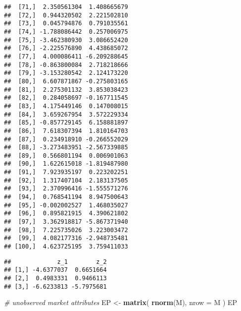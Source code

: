 \documentclass[
]{book}
\newenvironment{Shaded}{\begin{snugshade}}{\end{snugshade}}
\newcommand{\CommentTok}[1]{\textcolor[rgb]{0.56,0.35,0.01}{\textit{#1}}}
\newcommand{\DataTypeTok}[1]{\textcolor[rgb]{0.13,0.29,0.53}{#1}}
\newcommand{\DecValTok}[1]{\textcolor[rgb]{0.00,0.00,0.81}{#1}}
\newcommand{\KeywordTok}[1]{\textcolor[rgb]{0.13,0.29,0.53}{\textbf{#1}}}
\newcommand{\NormalTok}[1]{#1}
\newcommand{\OperatorTok}[1]{\textcolor[rgb]{0.81,0.36,0.00}{\textbf{#1}}}
\newcommand{\StringTok}[1]{\textcolor[rgb]{0.31,0.60,0.02}{#1}}
\begin{document}
\begin{verbatim}
##  [71,]  2.350561304  1.408665679
##  [72,]  0.944320502  2.221502810
##  [73,]  0.045794876  0.791035561
##  [74,] -1.788086442  0.257006975
##  [75,] -3.462380930  3.086652420
##  [76,] -2.225576890  4.438685072
##  [77,]  4.000086411 -6.209288645
##  [78,] -0.863800084  2.718218666
##  [79,] -3.153280542  2.124173220
##  [80,]  6.607871867 -0.275803165
##  [81,]  2.275301132  3.853038423
##  [82,]  0.284058697 -0.167711545
##  [83,]  4.175449146  0.147008015
##  [84,]  3.659267954  3.572229334
##  [85,] -0.857729145  6.158881897
##  [86,]  7.618307394  1.810164703
##  [87,]  0.234918910 -0.266552029
##  [88,] -3.273483951 -2.567339885
##  [89,]  0.566801194  0.006901063
##  [90,]  1.622615018 -1.819487980
##  [91,]  7.923935197  0.223202251
##  [92,]  1.317407104  2.183137505
##  [93,]  2.370996416 -1.555571276
##  [94,]  0.768541194  8.947500643
##  [95,] -0.002002527  1.468035027
##  [96,]  0.895821915  4.390621802
##  [97,]  3.362918817 -5.867371940
##  [98,]  7.225735026  3.223003472
##  [99,]  4.082177316 -2.948735481
## [100,]  4.623725195  3.759411033
\end{verbatim}

\begin{Shaded}
\end{Shaded}

\begin{verbatim}
##             z_1        z_2
## [1,] -4.6377037  0.6651664
## [2,]  0.4983331  0.9466113
## [3,] -6.6233813 -5.7975681
\end{verbatim}

\begin{Shaded}
\begin{Highlighting}[]
\CommentTok{# unobserved market attributes}
\NormalTok{EP <-}\StringTok{ }\KeywordTok{matrix}\NormalTok{(}
  \KeywordTok{rnorm}\NormalTok{(M),}
  \DataTypeTok{nrow =}\NormalTok{ M}
\NormalTok{)}
\NormalTok{EP}
\end{Highlighting}
\end{Shaded}
\end{document}
